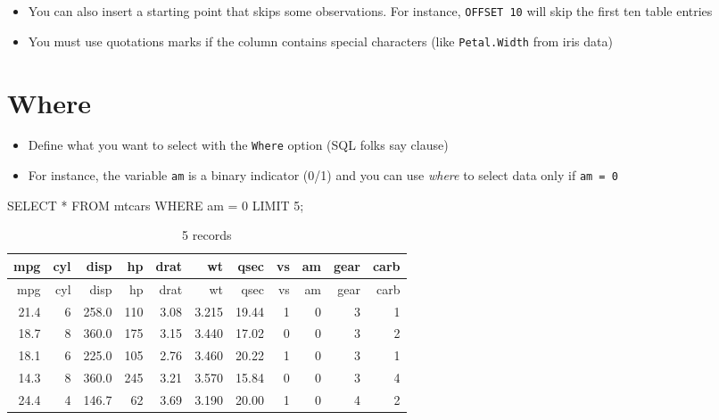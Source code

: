 \documentclass[
  letterpaper,
  DIV=11,
  numbers=noendperiod]{scrreprt}
\newenvironment{Shaded}{\begin{snugshade}}{\end{snugshade}}
\newcommand{\DecValTok}[1]{\textcolor[rgb]{0.68,0.00,0.00}{#1}}
\newcommand{\KeywordTok}[1]{\textcolor[rgb]{0.00,0.23,0.31}{#1}}
\newcommand{\NormalTok}[1]{\textcolor[rgb]{0.00,0.23,0.31}{#1}}
\newcommand{\OperatorTok}[1]{\textcolor[rgb]{0.37,0.37,0.37}{#1}}
\providecommand{\tightlist}{%
  \setlength{\itemsep}{0pt}\setlength{\parskip}{0pt}}\usepackage{longtable,booktabs,array}
\begin{document}
\begin{itemize}
\tightlist
\item
  You can also insert a starting point that skips some observations. For
  instance, \texttt{OFFSET\ 10} will skip the first ten table entries
\item
  You must use quotations marks if the column contains special
  characters (like
  \texttt{\textquotesingle{}Petal.Width\textquotesingle{}} from iris
  data)
\end{itemize}

\hypertarget{where}{%
\section{Where}\label{where}}

\begin{itemize}
\tightlist
\item
  Define what you want to select with the \texttt{Where} option (SQL
  folks say clause)
\item
  For instance, the variable \texttt{am} is a binary indicator (0/1) and
  you can use \emph{where} to select data only if \texttt{am\ =\ 0}
\end{itemize}

\begin{Shaded}
\begin{Highlighting}[]
\KeywordTok{SELECT} \OperatorTok{*} \KeywordTok{FROM}\NormalTok{ mtcars }\KeywordTok{WHERE}\NormalTok{ am }\OperatorTok{=} \DecValTok{0} \KeywordTok{LIMIT} \DecValTok{5}\NormalTok{;}
\end{Highlighting}
\end{Shaded}

\begin{longtable}[]{@{}rrrrrrrrrrr@{}}
\caption{5 records}\tabularnewline
\toprule()
mpg & cyl & disp & hp & drat & wt & qsec & vs & am & gear & carb \\
\midrule()
\endfirsthead
\toprule()
mpg & cyl & disp & hp & drat & wt & qsec & vs & am & gear & carb \\
\midrule()
\endhead
21.4 & 6 & 258.0 & 110 & 3.08 & 3.215 & 19.44 & 1 & 0 & 3 & 1 \\
18.7 & 8 & 360.0 & 175 & 3.15 & 3.440 & 17.02 & 0 & 0 & 3 & 2 \\
18.1 & 6 & 225.0 & 105 & 2.76 & 3.460 & 20.22 & 1 & 0 & 3 & 1 \\
14.3 & 8 & 360.0 & 245 & 3.21 & 3.570 & 15.84 & 0 & 0 & 3 & 4 \\
24.4 & 4 & 146.7 & 62 & 3.69 & 3.190 & 20.00 & 1 & 0 & 4 & 2 \\
\bottomrule()
\end{longtable}
\end{document}
